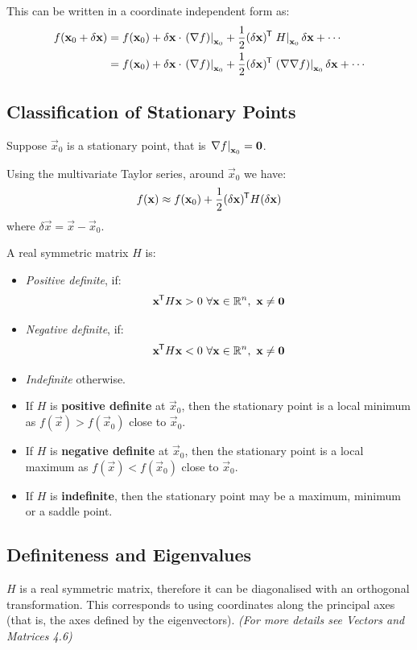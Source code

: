 \documentclass[../main.tex]{subfiles}
\begin{document}
This can be written in a coordinate independent form as:
\begin{align*}
  f(\mathbf{\bm{x}}_0 + \delta \mathbf{\bm{x}}) &= f(\mathbf{\bm{x}}_0) + \delta \mathbf{\bm{x}} \cdot \left. (\nabla f) \right|_{\mathbf{\bm{x}}_0} + \frac{1}{2} (\delta \mathbf{\bm{x}})^{{\mkern-1.5mu\mathsf{T}}} \left. H \right|_{\mathbf{\bm{x}}_0} \delta \mathbf{\bm{x}} + \cdots \\
                                & =f(\mathbf{\bm{x}}_0) + \delta \mathbf{\bm{x}} \cdot \left. (\nabla f) \right|_{\mathbf{\bm{x}}_0} + \frac{1}{2} (\delta \mathbf{\bm{x}})^{{\mkern-1.5mu\mathsf{T}}} \left. (\nabla \nabla f) \right|_{\mathbf{\bm{x}}_0} \delta \mathbf{\bm{x}} + \cdots
\end{align*}
\subsection{Classification of Stationary Points}
Suppose $\vec{x}_0$ is a stationary point, that is $\left. \nabla f \right|_{\mathbf{\bm{x}}_0} = \mathbf{\bm{0}}$.

Using the multivariate Taylor series, around $\vec{x}_0$ we have:
\[
  f(\mathbf{\bm{x}}) \approx f(\mathbf{\bm{x}}_0) + \frac{1}{2} (\delta \mathbf{\bm{x}})^{{\mkern-1.5mu\mathsf{T}}} H (\delta\mathbf{\bm{x}})
\]
where $\delta \vec{x} = \vec{x} - \vec{x}_0$.
\begin{definition}
  A real symmetric matrix $H$ is:
  \begin{itemize}
    \item \textit{Positive definite}, if:
      \[
        \mathbf{\bm{x}}^{{\mkern-1.5mu\mathsf{T}}} H \mathbf{\bm{x}} > 0\ \forall \mathbf{\bm{x}} \in \mathbb{R}^{n},\ \mathbf{\bm{x}} \neq \mathbf{\bm{0}}
      \]
    \item \textit{Negative definite}, if:
      \[
        \mathbf{\bm{x}}^{{\mkern-1.5mu\mathsf{T}}} H \mathbf{\bm{x}} < 0\ \forall \mathbf{\bm{x}} \in \mathbb{R}^{n},\ \mathbf{\bm{x}} \neq \mathbf{\bm{0}}
      \]
    \item \textit{Indefinite} otherwise.
  \end{itemize}
\end{definition}
\begin{itemize}
  \item If $H$ is \textbf{positive definite} at $\vec{x}_0$, then the stationary point is a local minimum as $f(\vec{x}) > f(\vec{x}_0)$ close to $\vec{x}_0$.
  \item If $H$ is \textbf{negative definite} at $\vec{x}_0$, then the stationary point is a local maximum as $f(\vec{x}) < f(\vec{x}_0)$ close to $\vec{x}_0$.
  \item If $H$ is \textbf{indefinite}, then the stationary point may be a maximum, minimum or a saddle point.
\end{itemize}
\subsection{Definiteness and Eigenvalues}
$H$ is a real symmetric matrix, therefore it can be diagonalised with an orthogonal transformation. This corresponds to using coordinates along the principal axes (that is, the axes defined by the eigenvectors).
\textit{(For more details see Vectors and Matrices 4.6)}
\end{document}
